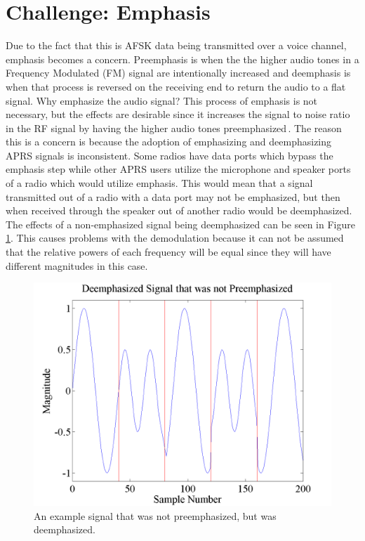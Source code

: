 \section{Challenge: Emphasis}
Due to the fact that this is AFSK data being transmitted over a voice channel, emphasis becomes a concern. Preemphasis is when the the higher audio tones in a Frequency Modulated (FM) signal are intentionally increased and deemphasis is when that process is reversed on the receiving end to return the audio to a flat signal. Why emphasize the audio signal? This process of emphasis is not necessary, but the effects are desirable since it increases the signal to noise ratio in the RF signal by having the higher audio tones preemphasized\,\cite{Gibilisco1994}. The reason this is a concern is because the adoption of emphasizing and deemphasizing APRS signals is inconsistent. Some radios have data ports which bypass the emphasis step while other APRS users utilize the microphone and speaker ports of a radio which would utilize emphasis. This would mean that a signal transmitted out of a radio with a data port may not be emphasized, but then when received through the speaker out of another radio would be deemphasized. The effects of a non-emphasized signal being deemphasized can be seen in Figure \ref{emphasisExample}. This causes problems with the demodulation because it can not be assumed that the relative powers of each frequency will be equal since they will have different magnitudes in this case. 
\begin{figure}
  \centering
	\includegraphics[width=0.75\linewidth]{images/DeemphasizedSignalthatwasnotPreemphasized.png} 
	\caption{An example signal that was not preemphasized, but was deemphasized.}
   \label{emphasisExample}
\end{figure}
